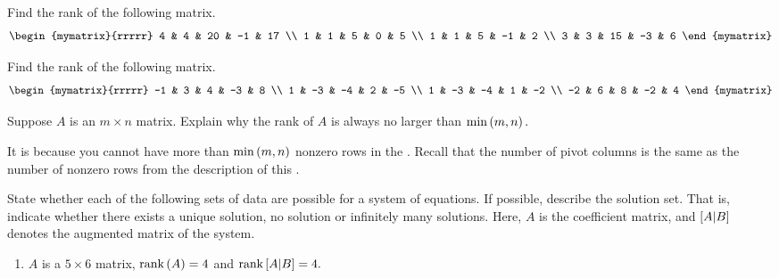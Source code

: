 \begin{enumialphparenastyle}
\begin{ex} Find the rank of the following matrix.
\begin{equation*}
\begin{mymatrix}{rrrrr}
4 & 4 & 20 & -1 & 17 \\
1 & 1 & 5 & 0 & 5 \\
1 & 1 & 5 & -1 & 2 \\
3 & 3 & 15 & -3 & 6
\end{mymatrix}
\end{equation*}
\end{ex}

\begin{ex} Find the rank of the following matrix.
\begin{equation*}
\begin{mymatrix}{rrrrr}
-1 & 3 & 4 & -3 & 8 \\
1 & -3 & -4 & 2 & -5 \\
1 & -3 & -4 & 1 & -2 \\
-2 & 6 & 8 & -2 & 4
\end{mymatrix}
\end{equation*}
\end{ex}

\begin{ex} Suppose $A$ is an $m\times n$ matrix. Explain why the rank of $A$ is
always no larger than $\min \left(m,n\right) .$
\begin{sol}
It is because you cannot
have more than $\min \left(m,n\right) $ nonzero rows in the {\rref}. Recall that the number of pivot columns is the same as the
number of nonzero rows from the description of this {\rref}.
\end{sol}
\end{ex}

\begin{ex}
  State whether each of the following sets of data are
  possible for a system of equations. If possible, describe the
  solution set.  That is, indicate whether there exists a unique
  solution, no solution or infinitely many solutions. Here, $A$ is
  the coefficient matrix, and $\left[A|B \right]$ denotes the
  augmented matrix of the system.
  
  \begin{enumerate}
  \item $A$ is a $5\times 6$ matrix, $\mbox{rank}\left(A\right) =4$ and 
    $\mbox{rank}\left[A|B \right] =4.$ 
    

\end{enumerate}
\end{ex}
\end{enumialphparenastyle}
